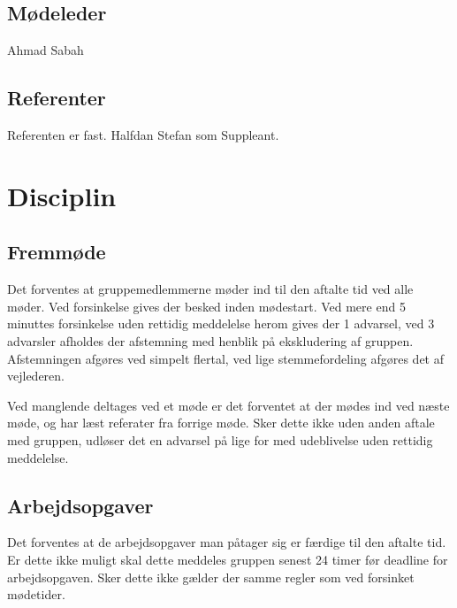 \documentclass[a4paper,article,11pt,oneside]{Memoir}
\begin{document}
\section{Mødeleder}
Ahmad Sabah
\section{Referenter}
Referenten er fast.
Halfdan 
Stefan som Suppleant.
\chapter{Disciplin}
\section{Fremmøde}
Det forventes at gruppemedlemmerne møder ind til den aftalte tid ved alle møder.
Ved forsinkelse gives der besked inden mødestart.  Ved mere end  5 minuttes forsinkelse uden rettidig meddelelse herom gives der 1 advarsel, ved 3 advarsler afholdes der afstemning med henblik på ekskludering af gruppen. Afstemningen afgøres ved simpelt flertal, ved lige stemmefordeling afgøres det af vejlederen.

Ved manglende deltages ved et møde er det forventet at der mødes ind ved næste møde, og har læst referater fra forrige møde. Sker dette ikke uden anden aftale med gruppen, udløser det en advarsel på lige for med udeblivelse uden rettidig meddelelse.

\section{Arbejdsopgaver}
Det forventes at de arbejdsopgaver man påtager sig er færdige til den aftalte tid. Er dette ikke muligt skal dette meddeles gruppen senest 24 timer før deadline for arbejdsopgaven. Sker dette ikke gælder der samme regler som ved forsinket mødetider.


\end{document}
